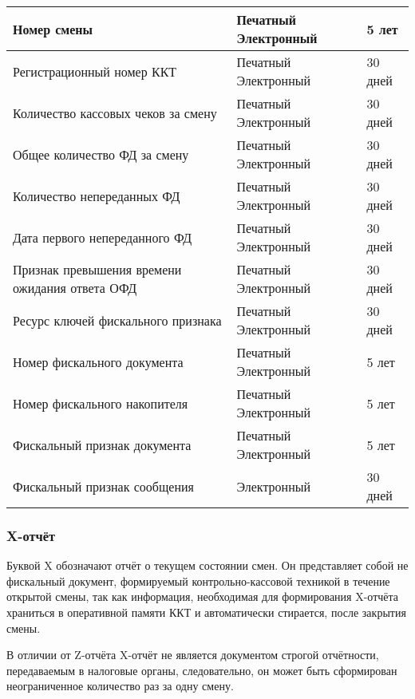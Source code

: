 \begin{xltabular}{\textwidth}{|>{\raggedright\arraybackslash}p{5cm}|X|X|}
	Номер смены& Печатный \newline Электронный & 5 лет \\ \hline
	Регистрационный номер ККТ& Печатный \newline Электронный & 30 дней \\ \hline
	Количество кассовых чеков за смену& Печатный \newline Электронный & 30 дней \\ \hline
	Общее количество ФД за смену& Печатный \newline Электронный & 30 дней \\ \hline
	Количество непереданных ФД& Печатный \newline Электронный & 30 дней \\ \hline
	Дата первого непереданного ФД& Печатный \newline Электронный & 30 дней \\ \hline
	Признак превышения времени ожидания ответа ОФД& Печатный \newline Электронный & 30 дней \\ \hline
	Ресурс ключей фискального признака& Печатный \newline Электронный & 30 дней \\ \hline
	Номер фискального документа& Печатный \newline Электронный & 5 лет \\ \hline
	Номер фискального накопителя& Печатный \newline Электронный & 5 лет \\ \hline
	Фискальный признак документа& Печатный \newline Электронный & 5 лет \\ \hline
	Фискальный признак сообщения& Электронный & 30 дней \\ \hline
\end{xltabular} 
 
\subsubsection{X-отчёт}
Буквой X обозначают отчёт о текущем состоянии смен. Он представляет собой не фискальный документ, формируемый контрольно-кассовой техникой в течение открытой смены, так как информация, необходимая для формирования X-отчёта храниться в оперативной памяти ККТ и автоматически стирается, после закрытия смены.

В отличии от Z-отчёта X-отчёт не является документом строгой отчётности, передаваемым в налоговые органы, следовательно, он может быть сформирован неограниченное количество раз за одну смену. 

